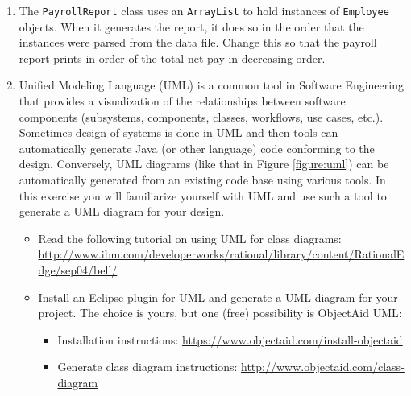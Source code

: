 \documentclass[12pt]{scrartcl}
\begin{document}
\begin{enumerate}
  \item The \texttt{PayrollReport} class uses an 
    \texttt{ArrayList} to hold instances of 
    \texttt{Employee} objects.  When it generates the report, 
    it does so in the order that the instances were parsed from the 
    data file.  Change this so that the payroll report prints in order 
    of the total net pay in decreasing order.  
    
  \item Unified Modeling Language (UML) is a common tool in Software
    Engineering that provides a visualization of the relationships 
    between software components (subsystems, components, classes, 
    workflows, use cases, etc.).  Sometimes design of systems is done 
    in UML and then tools can automatically generate Java (or other 
    language) code conforming to the design.  Conversely, UML diagrams 
    (like that in Figure \ref{figure:uml}) can be automatically generated 
    from an existing code base using various tools.  In this exercise 
    you will familiarize yourself with UML and use such a tool to 
    generate a UML diagram for your design.
    \begin{itemize}
      \item Read the following tutorial on using UML for class diagrams:
\url{http://www.ibm.com/developerworks/rational/library/content/RationalEdge/sep04/bell/}
      \item Install an Eclipse plugin for UML and generate a UML diagram 
      for your project.  The choice is yours, but one (free) possibility 
      is ObjectAid UML:
      \begin{itemize}
        \item Installation instructions: 
        \url{https://www.objectaid.com/install-objectaid}
	    \item Generate class diagram instructions: 
        \url{http://www.objectaid.com/class-diagram}
      \end{itemize}
    \end{itemize}
\end{enumerate}
\end{document}

